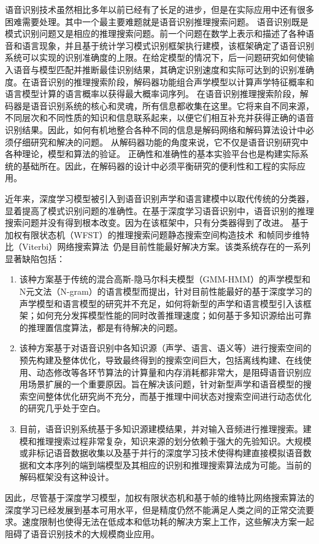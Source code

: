 语音识别技术虽然相比多年以前已经有了长足的进步，但是在实际应用中还有很多困难需要处理。其中一个最主要难题就是语音识别推理搜索问题。
%
语音识别既是模式识别问题又是相应的推理搜索问题。前一个问题在数学上表示和描述了各种语音和语言现象，并且基于统计学习模式识别框架执行建模，该框架确定了语音识别系统可以实现的识别准确度的上限。在给定模型的情况下，后一问题研究如何使输入语音与模型匹配并推断最佳识别结果，其确定识别速度和实际可达到的识别准确度。在语音识别的推理搜索阶段，解码器功能组合声学模型以计算声学特征概率和语言模型计算的语言概率以获得最大概率词序列。
在语音识别推理搜索阶段，解码器是语音识别系统的核心和灵魂，所有信息都收集在这里。它将来自不同来源，不同层次和不同性质的知识和信息联系起来，以便它们相互补充并获得正确的语音识别结果。因此，如何有机地整合各种不同的信息是解码网络和解码算法设计中必须仔细研究和解决的问题。
从解码器功能的角度来说，它不仅是语音识别研究中各种理论，模型和算法的验证。
正确性和准确性的基本实验平台也是构建实际系统的基础所在。因此，在解码器的设计中必须平衡研究的便利性和工程的实际应用。


近年来，深度学习模型被引入到语音识别声学和语言建模中以取代传统的分类器，显着提高了模式识别问题的准确性。在基于深度学习语音识别中，语音识别的推理搜索问题并没有得到根本改变。因为在该框架中，只有分类器得到了改进。
基于加权有限状态机（WFST）的推理搜索问题静态搜索空间构造技术~\cite{mohri2002weighted}和帧同步维特比（Viterbi）网络搜索算法~\cite{forney1973viterbi}仍是目前性能最好解决方案。该类系统存在的一系列显著缺陷包括：
\begin{enumerate}
\item 
该种方案基于传统的混合高斯-隐马尔科夫模型（GMM-HMM）的声学模型和N元文法（N-gram）的语言模型而提出，针对目前性能最好的基于深度学习的声学模型和语言模型的研究并不充足，如何将新型的声学和语言模型引入该框架；如何充分发挥模型性能的同时改善推理速度；如何基于多知识源给出可靠的推理置信度算法，都是有待解决的问题。
\item 
该种方案基于对语音识别中各知识源（声学、语言、语义等）进行搜索空间的预先构建及整体优化，导致最终得到的搜索空间巨大，包括离线构建、在线使用、动态修改等各环节算法的计算量和内存消耗都非常大，是阻碍语音识别应用场景扩展的一个重要原因。旨在解决该问题，针对新型声学和语音模型的搜索空间整体优化研究尚不充分，而基于推理中间状态对搜索空间进行动态优化的研究几乎处于空白。
\item 目前，语音识别系统基于多知识源建模结果，并对输入音频进行推理搜索。建模和推理搜索过程非常复杂，知识来源的划分依赖于强大的先验知识。大规模或非标记语音数据收集以及基于并行的深度学习技术使得构建直接模拟语音数据和文本序列的端到端模型及其相应的识别和推理搜索算法成为可能。当前的解码框架没有这种设计。
\end{enumerate}
因此，尽管基于深度学习模型，加权有限状态机和基于帧的维特比网络搜索算法的深度学习已经发展到基本可用水平，但是精度仍然不能满足人类之间的正常交流要求。速度限制也使得无法在低成本和低功耗的解决方案上工作，这些解决方案一起阻碍了语音识别技术的大规模商业应用。

